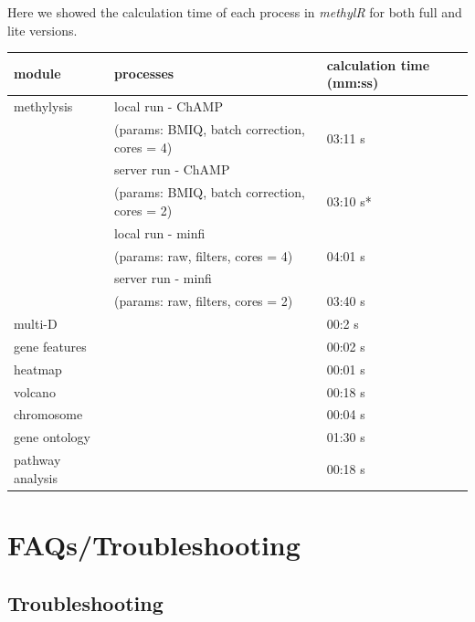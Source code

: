 \documentclass[
  a4paper,
  DIV=11,
  numbers=noendperiod,
  oneside,
  open=any]{scrreport}
\begin{document}
Here we showed the calculation time of each process in \emph{methylR}
for both full and lite versions.

\begin{longtable}[]{@{}lll@{}}
\toprule\noalign{}
module & processes & calculation time (mm:ss) \\
\midrule\noalign{}
\endhead
\bottomrule\noalign{}
\endlastfoot
methylysis & local run - ChAMP & \\
& (params: BMIQ, batch correction, cores = 4) & 03:11 s \\
& server run - ChAMP & \\
& (params: BMIQ, batch correction, cores = 2) & 03:10 s* \\
& local run - minfi & \\
& (params: raw, filters, cores = 4) & 04:01 s \\
& server run - minfi & \\
& (params: raw, filters, cores = 2) & 03:40 s \\
multi-D & & 00:2 s \\
gene features & & 00:02 s \\
heatmap & & 00:01 s \\
volcano & & 00:18 s \\
chromosome & & 00:04 s \\
gene ontology & & 01:30 s \\
pathway analysis & & 00:18 s \\
\end{longtable}

\chapter{FAQs/Troubleshooting}\label{sec-faq}

\section{Troubleshooting}\label{troubleshooting}
\end{document}
